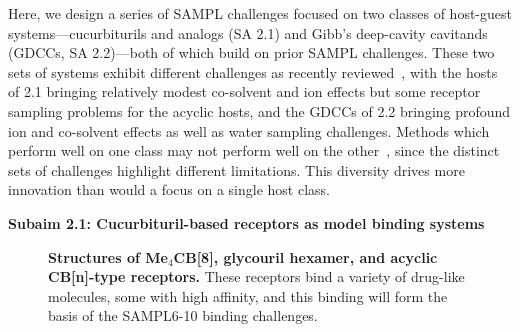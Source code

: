 \documentclass[11pt]{article}
\begin{document}
Here, we design a series of SAMPL challenges focused on two classes of host-guest systems---cucurbiturils and analogs (SA 2.1) and Gibb's deep-cavity cavitands (GDCCs, SA 2.2)---both of which build on prior SAMPL challenges.
These two sets of systems exhibit different challenges as recently reviewed~\cite{mobley_predicting_2016}, with the hosts of 2.1 bringing relatively modest co-solvent and ion effects but some receptor sampling problems for the acyclic hosts, and the GDCCs of 2.2 bringing profound ion and co-solvent effects as well as water sampling challenges.
Methods which perform well on one class may not perform well on the other~\cite{mobley_predicting_2016}, since the distinct sets of challenges highlight different limitations.
This diversity drives more innovation than would a focus on a single host class.




\textbf{Subaim 2.1: Cucurbituril-based receptors as model binding systems}

\begin{figure}[h]
\begin{centering}

\end{centering}

\vspace{0.1in}
\caption{\label{figure:CB} \footnotesize {\bf Structures of Me$_4$CB[8], glycouril hexamer, and acyclic CB[n]-type receptors.} These receptors bind a variety of drug-like molecules, some with high affinity, and this binding will form the basis of the SAMPL6-10 binding challenges.}

\end{figure}
\end{document}
